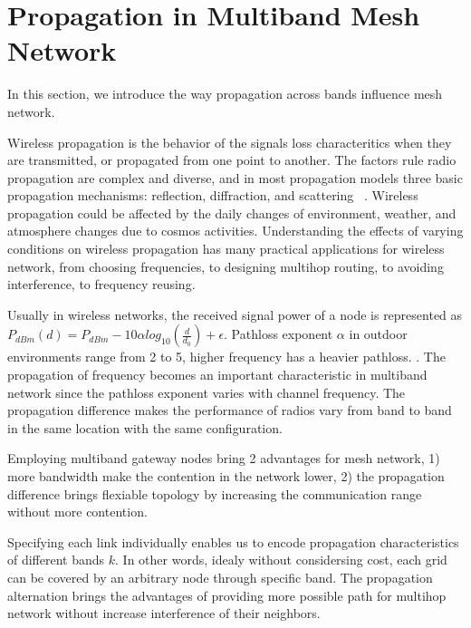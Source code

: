\section{Propagation in Multiband Mesh Network}
\label{sec:propagation}

In this section, we introduce the way propagation across bands influence mesh network.

Wireless propagation is the behavior of the signals loss characteritics when they are transmitted, or propagated from one point to another.
The factors rule radio propagation are complex and diverse, and in most propagation models three basic propagation mechanisms: reflection, diffraction, and scattering ~\cite{andersen1995propagation}.
Wireless propagation could be affected by the daily changes of environment, weather, and atmosphere changes due to cosmos activities. 
Understanding the effects of varying conditions on wireless propagation has many practical applications for wireless network, from choosing frequencies, to designing multihop routing, to avoiding interference, to frequency reusing.

Usually in wireless networks, the received signal power of a node is represented as $P_{dBm}(d)=P_{dBm}-10\alpha log_{10}(\frac{d}{d_0})+\epsilon$. Pathloss exponent $\alpha$ in outdoor environments range from 2 to 5, higher frequency has a heavier pathloss. \cite{camp2006measurement}. 
The propagation of frequency becomes an important characteristic in multiband network since the pathloss exponent varies with channel frequency. 
The propagation difference makes the performance of radios vary from band to band in the same location with the same configuration.

Employing multiband gateway nodes bring 2 advantages for mesh network, 1) more bandwidth make the contention in the network lower,
 2) the propagation difference brings flexiable topology by increasing the communication range without more contention.

Specifying each link individually enables us to encode propagation characteristics of different bands $k$. In other words, idealy without considersing cost, each grid can be covered by an arbitrary node through specific band.  
The propagation alternation brings the advantages of providing more possible path for multihop network without increase interference of their neighbors. 

